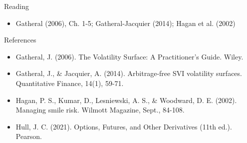 \documentclass[aspectratio=169,10pt]{beamer}
\begin{document}
\begin{frame}{Reading}
\begin{itemize}
  \item Gatheral (2006), Ch. 1-5; Gatheral-Jacquier (2014); Hagan et al. (2002)
\end{itemize}
\end{frame}

\begin{frame}{References}
\scriptsize\begin{itemize}\setlength{\itemsep}{3pt}
  \item Gatheral, J. (2006). The Volatility Surface: A Practitioner's Guide. Wiley.
  \item Gatheral, J., \& Jacquier, A. (2014). Arbitrage-free SVI volatility surfaces. Quantitative Finance, 14(1), 59-71.
  \item Hagan, P. S., Kumar, D., Lesniewski, A. S., \& Woodward, D. E. (2002). Managing smile risk. Wilmott Magazine, Sept., 84-108.
  \item Hull, J. C. (2021). Options, Futures, and Other Derivatives (11th ed.). Pearson.
\end{itemize}
\end{frame}
\end{document}
